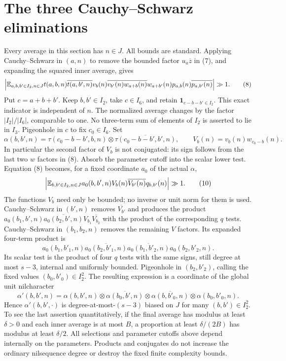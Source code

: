 \documentclass[11pt]{article}
\newcommand{\one}{\mathbf1}
\begin{document}
\section{The three Cauchy--Schwarz eliminations}
Every average in this section has $n\in J$. All bounds are standard.
Applying Cauchy--Schwarz in $(a,n)$ to remove the bounded factor
$u_a\overline z$ in (7), and expanding the squared inner average, gives
\[
 \left|\mathbb E_{a,b,b'\in I_2,n\in J}
 t(a,b,n)\overline{t(a,b',n)}v_b(n)\overline{v_{b'}(n)}
 \overline{w_{a+b}(n)}w_{a+b'}(n)
 p_{a,b}(n)\overline{p_{a,b'}(n)}\right|\gg1.             \tag{8}
\]
Put $c=a+b+b'$. Keep $b,b'\in I_2$, take $c\in I_6$, and retain
$\one_{c-b-b'\in I_2}$. This exact indicator is independent of $n$.
The normalized average changes by the factor $|I_2|/|I_6|$, comparable
to one. No three-term sum of elements of $I_2$ is asserted to lie in $I_3$.
Pigeonhole in $c$ to fix $c_0\in I_6$. Set
\[
 \alpha(b,b',n)=\tau(c_0-b-b',b,n)
                    \otimes\overline{\tau(c_0-b-b',b',n)},\qquad
 V_b(n)=v_b(n)w_{c_0-b}(n).                              \tag{9}
\]
In particular the second factor of $V_b$ is not conjugated: its sign
follows from the last two $w$ factors in (8). Absorb the parameter cutoff
into the scalar lower test. Equation (8) becomes, for a fixed coordinate
$a_0$ of the actual $\alpha$,
\[
 \left|\mathbb E_{b,b'\in I_2,n\in J}
 a_0(b,b',n)V_b(n)\overline{V_{b'}(n)}q_{b,b'}(n)\right|\gg1. \tag{10}
\]
The functions $V_b$ need only be bounded; no inverse or unit norm for them
is used. Cauchy--Schwarz in $(b',n)$ removes $\overline{V_{b'}}$ and
produces the product
$a_0(b_1,b',n)\overline{a_0(b_2,b',n)}V_{b_1}\overline{V_{b_2}}$
with the product of the corresponding $q$ tests. Cauchy--Schwarz in
$(b_1,b_2,n)$ removes the remaining $V$ factors. Its expanded four-term
product is
\[
 a_0(b_1,b'_1,n)\overline{a_0(b_2,b'_1,n)}
 \overline{a_0(b_1,b'_2,n)}a_0(b_2,b'_2,n).               \tag{11}
\]
Its scalar test is the product of four $q$ tests with the same signs,
still degree at most $s-3$, internal and uniformly bounded.
Pigeonhole in $(b_2,b'_2)$, calling the fixed values $(b_0,b'_0)\in I_2^2$.
The resulting expression is a coordinate of the global unit nilcharacter
\[
 \alpha'(b,b',n)=\alpha(b,b',n)\otimes\overline{\alpha(b_0,b',n)}
 \otimes\overline{\alpha(b,b'_0,n)}\otimes\alpha(b_0,b'_0,n). \tag{12}
\]
Hence $\alpha'(b,b',\cdot)$ is degree-at-most-$(s-3)$ biased on $J$
for many $(b,b')\in I_2^2$. To see the last assertion quantitatively,
if the final average has modulus at least $\delta>0$ and each inner
average is at most $B$, a proportion at least $\delta/(2B)$ has modulus
at least $\delta/2$. All selections and parameter cutoffs above depend
internally on the parameters. Products and conjugates do not increase the
ordinary nilsequence degree or destroy the fixed finite complexity bounds.
\end{document}
